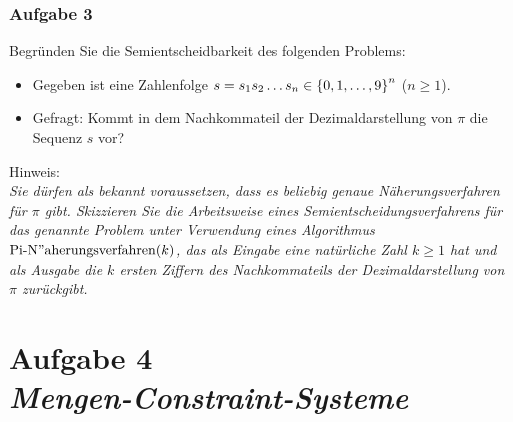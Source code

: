 \documentclass{beamer}
\begin{document}
	\begin{frame} \frametitle{Aufgabe 3}
		\justifying \small
		Begründen Sie die Semientscheidbarkeit des folgenden Problems:
		\begin{itemize}
			\item Gegeben ist eine Zahlenfolge $s = s_1 s_2 \dots s_n \in \left\{ 0, 1, \dots , 9 \right\}^n$ ($n \ge 1$).
			\item Gefragt: Kommt in dem Nachkommateil der Dezimaldarstellung von $\pi$ die Sequenz $s$ vor?
		\end{itemize}

		Hinweis: \\ \itshape
		Sie dürfen als bekannt voraussetzen, dass es beliebig genaue Näherungs\-verfahren für $\pi$ gibt. Skizzieren Sie die Arbeitsweise eines Semientscheidungsverfahrens für das genannte Problem unter Verwendung eines Algorithmus  $\operatorname{Pi-N"aherungsverfahren}(k)$, das als Eingabe eine natürliche Zahl $k \ge 1$ hat und als Ausgabe die $k$ ersten Ziffern des Nachkommateils der Dezimaldarstellung von $\pi$ zurückgibt.
	\end{frame}

	\section{Aufgabe 4 \\ \itshape Mengen-Constraint-Systeme}
	
\end{document}
